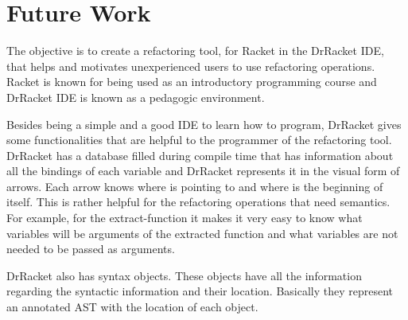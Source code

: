 
% 
% 


\section{Future Work}





The objective is to create a refactoring tool, for Racket in the DrRacket IDE, that helps and motivates unexperienced users to use refactoring operations. Racket is known for being used as an introductory programming course and DrRacket IDE is known as a pedagogic environment.

Besides being a simple and a good IDE to learn how to program, DrRacket gives some functionalities that are helpful to the programmer of the refactoring tool. 
DrRacket has a database filled during compile time that has information about all the bindings of each variable and DrRacket represents it in the visual form of arrows. 
Each arrow knows where is pointing to and where is the beginning of itself. 
This is rather helpful for the refactoring operations that need semantics.
For example, for the extract-function it makes it very easy to know what variables will be arguments of the extracted function and what variables are not needed to be passed as arguments.

DrRacket also has syntax objects. These objects have all the information regarding the syntactic information and their location. Basically they represent an annotated AST with the location of each object.



